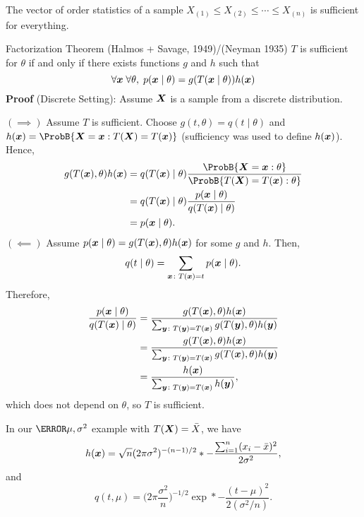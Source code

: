 The vector of order statistics of a sample $ X_{(1)}\le X_{(2)}\le \cdots\le X_{(n)} $
is sufficient for everything.
\begin{Theorem}{Factorization Theorem (Halmos + Savage, 1949)/(Neyman 1935)}{}
    $ T $ is sufficient for $ \theta $ if and only if
    there exists functions $ g $ and $ h $ such that
    \[ \forall \bm{x}\; \forall \theta,\; p(\bm{x}\mid \theta)
        =g(T(\bm{x}\mid \theta))h(\bm{x}) \]
    \tcblower{}
    \textbf{Proof} (Discrete Setting):
    Assume $ \bm{X} $ is a sample from a discrete distribution.

    $ (\implies) $ Assume $ T $ is sufficient. Choose $ g(t,\theta)=q(t\mid \theta) $
    and $ h(\Vector{x})=\ProbB{\Vector{X}=\Vector{x}\given T(\Vector{X})=T(\Vector{x})} $
    (sufficiency was used to define $ h(\bm{x}) $).
    Hence,
    \begin{align*}
        g(T(\Vector{x}),\theta)h(\Vector{x})
         & =q(T(\Vector{x})\mid \theta)\frac{\ProbB{\Vector{X}=\Vector{x}\given \theta}}{\ProbB{T(\Vector{X})=T(\Vector{x})\given \theta}} \\
         & =q(T(\Vector{x})\mid \theta)\frac{p(\Vector{x}\mid \theta)}{q(T(\Vector{x})\mid \theta)}                                        \\
         & =p(\Vector{x}\mid \theta).
    \end{align*}
    $ (\impliedby) $ Assume $ p(\bm{x}\mid \theta)=g(T(\bm{x}),\theta)h(\bm{x}) $ for some $ g $ and $ h $.
    Then,
    \[ q(t\mid \theta)=\sum_{\bm{x}\colon T(\bm{x})=t}p(\bm{x}\mid \theta). \]
    Therefore,
    \begin{align*}
        \frac{p(\bm{x}\mid \theta)}{q(T(\bm{x})\mid \theta)}
         & =\frac{g(T(\bm{x}),\theta)h(\bm{x})}{\sum_{\bm{y}\colon T(\bm{y})=T(\bm{x})}g(T(\bm{y}),\theta)h(\bm{y})} \\
         & =\frac{g(T(\bm{x}),\theta)h(\bm{x})}{\sum_{\bm{y}\colon T(\bm{y})=T(\bm{x})}g(T(\bm{x}),\theta)h(\bm{y})} \\
         & =\frac{h(\bm{x})}{\sum_{\bm{y}\colon T(\bm{y})=T(\bm{x})}h(\bm{y})},
    \end{align*}
    which does not depend on $ \theta $, so $ T $ is sufficient.
\end{Theorem}
\begin{Example}{}{}
    In our $ \N{\mu,\sigma^2} $ example with $ T(\bm{X})=\bar{X} $, we have
    \[ h(\bm{x})=\sqrt{n}(2\pi\sigma^2)^{-(n-1)/2}\relax*{-\frac{\sum_{i=1}^{n}(x_i-\bar{x})^2}{2\sigma^2}}, \]
    and
    \[ q(t,\mu)=\biggl(2\pi \frac{\sigma^2}{n}\biggr)^{-1/2}\exp*{-\frac{(t-\mu)^2}{2(\sigma^2/n)}}. \]
\end{Example}
